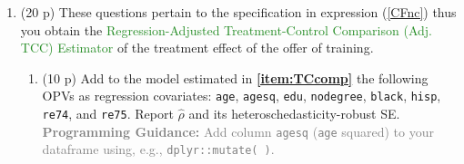 \documentclass[
]{article}
\providecommand{\tightlist}{%
  \setlength{\itemsep}{0pt}\setlength{\parskip}{0pt}}
\begin{document}
\begin{enumerate}
\def\labelenumi{\arabic{enumi}.}
\setcounter{enumi}{4}
\tightlist
\item
  (20 p) These questions pertain to the specification in expression
  (\ref{CFnc}) thus you obtain the
  \textcolor{ForestGreen}{Regression-Adjusted Treatment-Control Comparison (Adj. TCC) Estimator}
  of the treatment effect of the offer of training. \label{item:CFnc}

  \begin{enumerate}
  \def\labelenumii{\alph{enumii}.}
  \item
    (10 p) Add to the model estimated in \textbf{\ref{item:TCcomp}} the
    following OPVs as regression covariates: \texttt{age},
    \texttt{agesq}, \texttt{edu}, \texttt{nodegree}, \texttt{black},
    \texttt{hisp}, \texttt{re74}, and \texttt{re75}. Report
    \(\hat{\rho}\) and its heteroschedasticity-robust SE.
    \textcolor{gray}{\textbf{Programming Guidance:} Add column \texttt{agesq} (\texttt{age} squared) to your dataframe using, e.g., \texttt{dplyr::mutate( )}.}\label{item:CFnc-rho}


\end{enumerate}
\end{enumerate}
\end{document}
